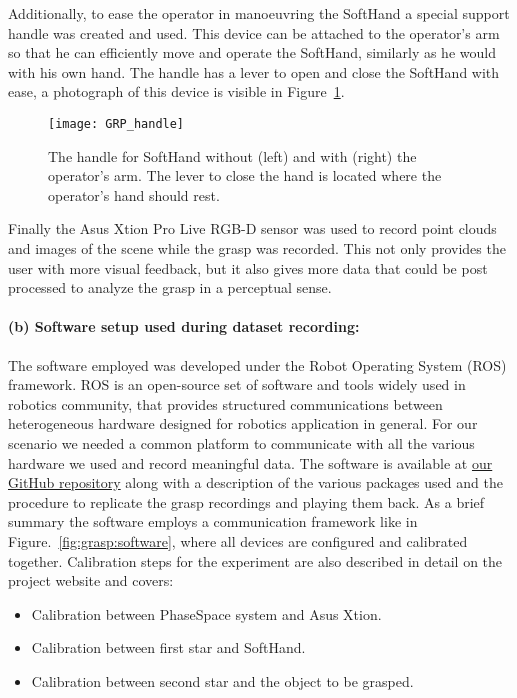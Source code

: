 Additionally, to ease the operator in manoeuvring the SoftHand a special support handle was created and used. This device can be attached to the operator's arm so that he can efficiently move and operate the SoftHand, similarly as he would with his own hand.
The handle has a lever to open and close the SoftHand with ease, a photograph of this device is visible in Figure~\ref{fig:grasp:handle}.
\begin{figure}[b!]
  \centering
  \texttt{[image: GRP\_handle]}
  \caption{The handle for SoftHand without (left) and with (right) the operator's arm. The lever to close the hand is located where the operator's hand should rest.}
  \label{fig:grasp:handle}
\end{figure}

Finally the Asus Xtion Pro Live RGB-D sensor was used to record point clouds and images of the scene while the grasp was recorded. This not only provides the user with more visual feedback, but it also gives more data that
could be post processed to analyze the grasp in a perceptual sense.
\paragraph{(b) Software setup used during dataset recording:}
The software employed was developed under the Robot Operating System (ROS) framework. ROS is an open-source set of software and tools widely used in robotics community,
that provides structured communications between heterogeneous hardware designed for robotics application in general.
For our scenario we needed a common platform to communicate with all the various hardware we used and record meaningful data.
The software is available at \href{https://github.com/CentroEPiaggio/unipi-grasp-datasets/tree/master/scenario1}{our GitHub repository} along with a description of the various packages used and the procedure to replicate the grasp
recordings and playing them back. %
As a brief summary the software employs a communication framework like in Figure.~\ref{fig:grasp:software}, %
where all devices are configured and calibrated together. 
Calibration steps for the experiment are also described in detail on the project website %
and covers:
\begin{itemize}
  \item Calibration between PhaseSpace system and Asus Xtion.
  \item Calibration between first star and SoftHand.
  \item Calibration between second star and the object to be grasped.
\end{itemize}

